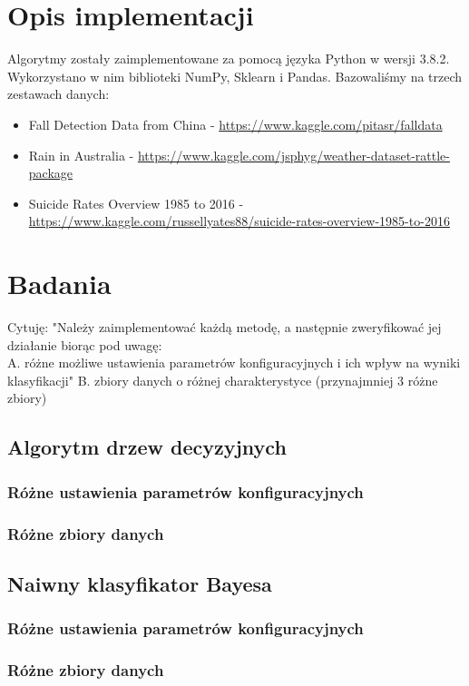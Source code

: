 \documentclass[a4paper,11pt]{article}
\begin{document}
\section{Opis implementacji}
Algorytmy zostały zaimplementowane za pomocą języka Python w wersji 3.8.2.
Wykorzystano w nim biblioteki NumPy, Sklearn i Pandas. Bazowaliśmy na trzech zestawach danych: 
\begin{itemize}
    \item{Fall Detection Data from China - \url{https://www.kaggle.com/pitasr/falldata}}
    \item{Rain in Australia - \url{https://www.kaggle.com/jsphyg/weather-dataset-rattle-package}}
    \item{Suicide Rates Overview 1985 to 2016 - \url{https://www.kaggle.com/russellyates88/suicide-rates-overview-1985-to-2016}}
\end{itemize}

\section{Badania}
\color{red}
Cytuję: "Należy zaimplementować każdą metodę, a następnie zweryfikować jej działanie biorąc pod uwagę:\\
A. różne możliwe ustawienia parametrów konfiguracyjnych i ich wpływ na wyniki klasyfikacji"
B. zbiory danych o różnej charakterystyce (przynajmniej 3 różne zbiory)
\color{black}

\subsection{Algorytm drzew decyzyjnych}
\subsubsection{Różne ustawienia parametrów konfiguracyjnych}
\subsubsection{Różne zbiory danych}

\subsection{Naiwny klasyfikator Bayesa}
\subsubsection{Różne ustawienia parametrów konfiguracyjnych}
\subsubsection{Różne zbiory danych}
\end{document}
